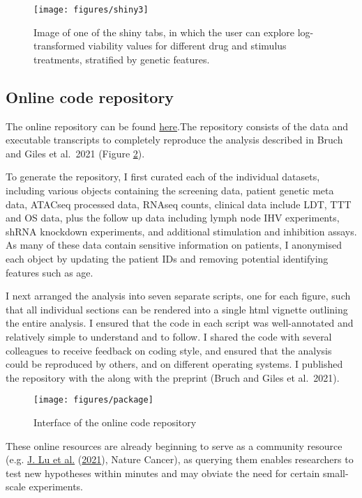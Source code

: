 \documentclass[11pt, a4paper, twosided]{book}
\begin{document}
\begin{figure}

{\centering \texttt{[image: figures/shiny3]} 

}

\caption{Image of one of the shiny tabs, in which the user can explore log-transformed viability values for different drug and stimulus treatments, stratified by genetic features.}\label{fig:shinyApp3}
\end{figure}
\hypertarget{online-code-repository}{%
\subsection{Online code repository}\label{online-code-repository}}

The online repository can be found \href{https://github.com/Huber-group-EMBL/CLLCytokineScreen2021}{here}.The repository consists of the data and executable transcripts to completely reproduce the analysis described in Bruch and Giles et al.~2021 (Figure \ref{fig:package1}).

To generate the repository, I first curated each of the individual datasets, including various objects containing the screening data, patient genetic meta data, ATACseq processed data, RNAseq counts, clinical data include LDT, TTT and OS data, plus the follow up data including lymph node IHV experiments, shRNA knockdown experiments, and additional stimulation and inhibition assays. As many of these data contain sensitive information on patients, I anonymised each object by updating the patient IDs and removing potential identifying features such as age.

I next arranged the analysis into seven separate scripts, one for each figure, such that all individual sections can be rendered into a single html vignette outlining the entire analysis. I ensured that the code in each script was well-annotated and relatively simple to understand and to follow. I shared the code with several colleagues to receive feedback on coding style, and ensured that the analysis could be reproduced by others, and on different operating systems. I published the repository with the along with the preprint (Bruch and Giles et al.~2021).


\begin{figure}

{\centering \texttt{[image: figures/package]} 

}

\caption{Interface of the online code repository}\label{fig:package1}
\end{figure}
These online resources are already beginning to serve as a community resource (e.g. \protect\hyperlink{ref-Lu2021}{J. Lu et al.} (\protect\hyperlink{ref-Lu2021}{2021}), Nature Cancer), as querying them enables researchers to test new hypotheses within minutes and may obviate the need for certain small-scale experiments.
\end{document}

